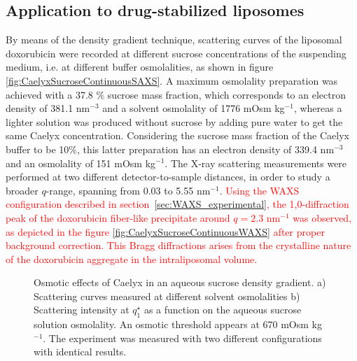 \subsection{Application to drug-stabilized liposomes}
\label{sec:OsmoticCaelyx}
By means of the density gradient technique, scattering curves of the liposomal doxorubicin were recorded at different sucrose concentrations of the suspending medium, i.e. at different buffer osmolalities, as shown in figure \ref{fig:CaelyxSucroseContinuousSAXS}. A maximum osmolality preparation was achieved with a 37.8 $\%$ sucrose mass fraction, which corresponds to an electron density of 381.1 nm$^{-3}$ and a solvent osmolality of 1776 mOsm kg$^{-1}$,  whereas a lighter solution was produced without sucrose by adding pure water to get the same Caelyx concentration. Considering the sucrose mass fraction of the Caelyx buffer to be 10$\%$, this latter preparation has an electron density of 339.4 nm$^{-3}$ and an osmolality of 151 mOsm kg$^{-1}$. The X-ray scattering measurements were performed at two different detector-to-sample distances, in order to study a broader $q$-range, spanning from 0.03 to 5.55 nm$^{-1}$. \textcolor{red}{Using the WAXS configuration described in section~\ref{sec:WAXS_experimental}, the 1,0-diffraction peak of the doxorubicin fiber-like precipitate around $q=2.3$ nm$^{-1}$ \citep{li_doxorubicin_1998} was observed, as depicted in the figure \ref{fig:CaelyxSucroseContinuousWAXS} after proper background correction. This Bragg diffractions arises from the crystalline nature of the doxorubicin aggregate in the intraliposomal volume.}



\begin{figure}
	\centering
		\qquad
		\caption[Osmotic effects of Caelyx in an aqueous sucrose density gradient.]{Osmotic effects of Caelyx in an aqueous sucrose density gradient. a) Scattering curves measured at different solvent osmolalities  b) Scattering intensity at $q^{\star}_1$ as a function on the aqueous sucrose solution osmolality. An osmotic threshold appears at 670 mOsm kg$^{-1}$. The experiment was measured with two different configurations with identical results.}
\end{figure}

